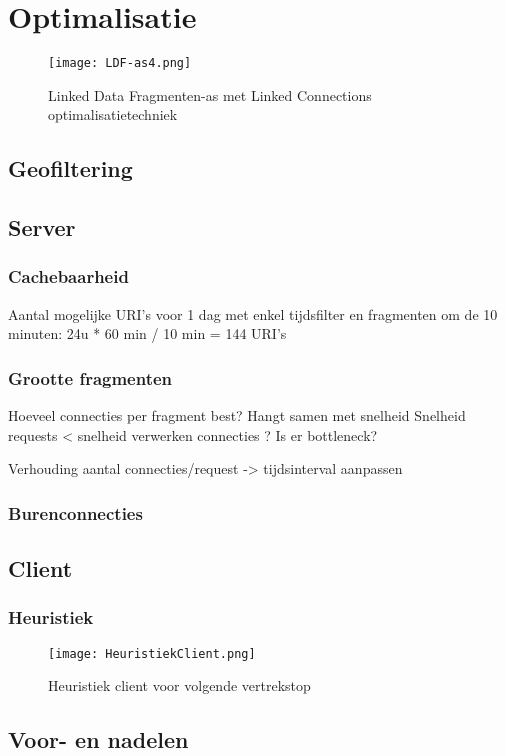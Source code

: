 \chapter{Optimalisatie}
\label{opt}

\begin{figure}[h!]
\centering
\texttt{[image: LDF-as4.png]}
\caption{Linked Data Fragmenten-as met Linked Connections optimalisatietechniek}
\end{figure}

\section{Geofiltering}

\section{Server}

\subsection{Cachebaarheid}

Aantal mogelijke URI's voor 1 dag met enkel tijdsfilter en fragmenten om de 10 minuten:
24u * 60 min / 10 min = 144 URI's
\subsection{Grootte fragmenten}

Hoeveel connecties per fragment best?
Hangt samen met snelheid
Snelheid requests < snelheid verwerken connecties ? Is er bottleneck?

Verhouding aantal connecties/request -> tijdsinterval aanpassen

\subsection{Burenconnecties}

\section{Client}

\subsection{Heuristiek}

\begin{figure}[h!]
\centering
\texttt{[image: HeuristiekClient.png]}
\caption{Heuristiek client voor volgende vertrekstop}
\end{figure}


\section{Voor- en nadelen}